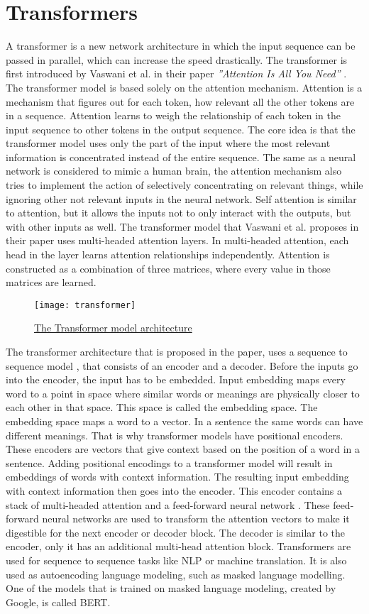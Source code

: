 \section{Transformers}
A transformer is a new network architecture in which the input sequence can be passed in parallel, which can increase the speed drastically. The transformer is first introduced by Vaswani et al. in their paper \textit{”Attention Is All You Need”} \cite{Transformers}. The transformer model is based solely on the attention mechanism. Attention is a mechanism that figures out for each token, how relevant all the other tokens are in a sequence. Attention learns to weigh the relationship of each token in the input sequence to other tokens in the output sequence. The core idea is that the transformer model uses only the part of the input where the most relevant information is concentrated instead of the entire sequence. The same as a neural network is considered to mimic a human brain, the attention mechanism also tries to implement the action of selectively concentrating on relevant things, while ignoring other not relevant inputs in the neural network. Self attention is similar to attention, but it allows the inputs not to only interact with the outputs, but with other inputs as well.  The transformer model that Vaswani et al. proposes in their paper uses multi-headed attention layers. In multi-headed attention, each head in the layer learns attention relationships independently. Attention is constructed as a combination of three matrices, where every value in those matrices are learned.\\
\begin{figure}[!htb]
    \texttt{[image: transformer]}
    \caption{\href{https://miro.medium.com/max/1812/1*57LYNxwBGcCFFhkOCSnJ3g.png}{The Transformer model architecture} }
\end{figure}
The transformer architecture that is proposed in the paper, uses a sequence to sequence model \cite{sts}, that consists of an encoder and a decoder. Before the inputs go into the encoder, the input has to be embedded. Input embedding maps every word to a point in space where similar words or meanings are physically closer to each other in that space. This space is called the embedding space. The embedding space maps a word to a vector. In a sentence the same words can have different meanings. That is why transformer models have positional encoders. These encoders are vectors that give context based on the position of a word in a sentence. Adding positional encodings to a transformer model will result in embeddings of words with context information. The resulting input embedding with context information then goes into the encoder. This encoder contains a stack of multi-headed attention and a feed-forward neural network \cite{ffn}. These feed-forward neural networks are used to transform the attention vectors to make it digestible for the next encoder or decoder block. The decoder is similar to the encoder, only it has an additional multi-head attention block. Transformers are used for sequence to sequence tasks like NLP or machine translation. It is also used as autoencoding language modeling, such as masked language modelling. One of the models that is trained on masked language modeling, created by Google, is called BERT. 
